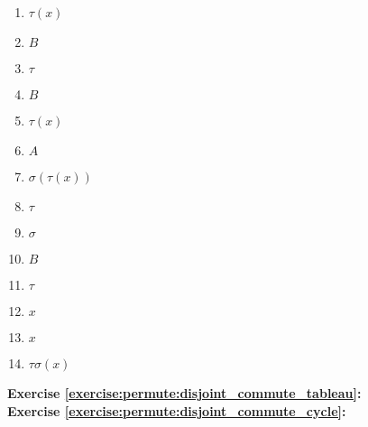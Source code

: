 \begin{multicols}{5}
\begin{enumerate}
\item
$\tau(x)$

\item
$B$

\item
$\tau$

\item
$B$

\item
$\tau(x)$

\item
$A$

\item
$\sigma(\tau(x))$

\item
$\tau$

\item
$\sigma$

\item
$B$

\item
$\tau$

\item
$x$

\item
$x$

\item
%
$\tau\sigma(x)$
\end{enumerate}
\end{multicols}

\noindent\textbf{Exercise \ref{exercise:permute:disjoint_commute_tableau}:}\\

\noindent\textbf{Exercise \ref{exercise:permute:disjoint_commute_cycle}:}\\

